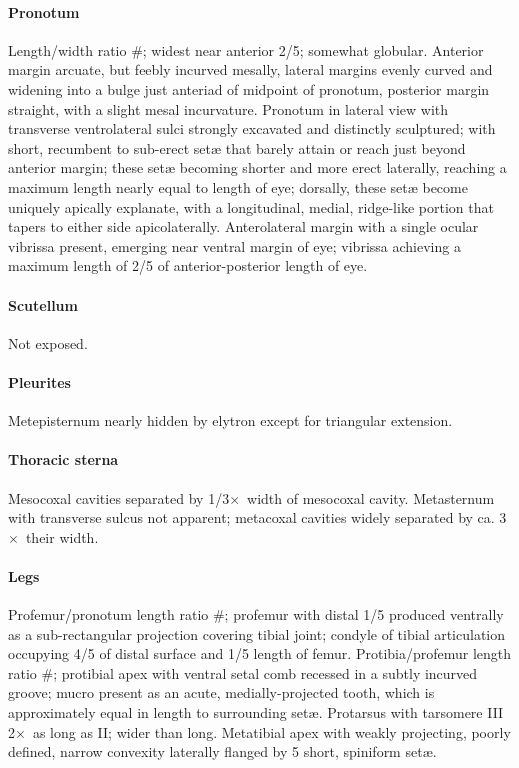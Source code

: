 \documentclass[fleqn,10pt,lineno]{wlpeerj} %
\newcommand{\x}{$\times$~}
\begin{document}
			\paragraph{Pronotum}
				Length/width ratio \#; widest near anterior 2/5; somewhat globular. 
				Anterior margin arcuate, but feebly incurved mesally, lateral margins evenly curved and widening into a bulge just anteriad of midpoint of pronotum, posterior margin straight, with a slight mesal incurvature. 
				Pronotum in lateral view with transverse ventrolateral sulci strongly excavated and distinctly sculptured; with short, recumbent to sub-erect set{\ae} that barely attain or reach just beyond anterior margin; these set{\ae} becoming shorter and more erect laterally, reaching a maximum length nearly equal to length of eye; dorsally, these set{\ae} become uniquely apically explanate, with a longitudinal, medial, ridge-like portion that tapers to either side apicolaterally.
				Anterolateral margin with a single ocular vibrissa present, emerging near ventral margin of eye; vibrissa achieving a maximum length of 2/5 of anterior-posterior length of eye.
			\paragraph{Scutellum}
				Not exposed.
			\paragraph{Pleurites}
				Metepisternum nearly hidden by elytron except for triangular extension.
			\paragraph{Thoracic sterna} 
				Mesocoxal cavities separated by 1/3\x width of mesocoxal cavity. 
				Metasternum with transverse sulcus not apparent; metacoxal cavities widely separated by ca. 3\x their width.
			\paragraph{Legs}
				Profemur/pronotum length ratio \#; profemur with distal 1/5 produced ventrally as a sub-rectangular projection covering tibial joint; condyle of tibial articulation occupying 4/5 of distal surface and 1/5 length of femur. 
				Protibia/profemur length ratio \#; protibial apex with ventral setal comb recessed in a subtly incurved groove; mucro present as an acute, medially-projected tooth, which is approximately equal in length to surrounding set{\ae}. 
				Protarsus with tarsomere III 2\x as long as II; wider than long. 
				Metatibial apex with weakly projecting, poorly defined, narrow convexity laterally flanged by 5 short, spiniform set{\ae}.
\end{document}
